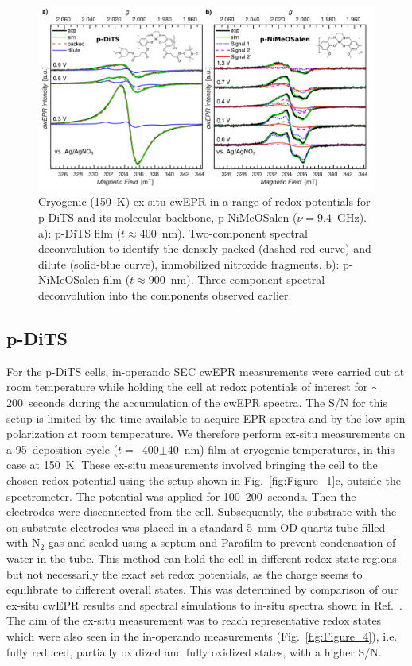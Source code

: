 \begin{figure}[ht!]
\centering
	\includegraphics[width=1\textwidth]{./operando_epr/figures/CRYO/Figure_7}
	\caption{Cryogenic (150~K) ex-situ cwEPR in a range of redox potentials for p-DiTS and its molecular backbone, p-NiMeOSalen ($\nu = 9.4$~GHz). a): p-DiTS film ($t\approx400$~nm). Two-component spectral deconvolution to identify the densely packed (dashed-red curve) and dilute (solid-blue curve), immobilized nitroxide fragments. b): p-NiMeOSalen film ($t\approx900$~nm). Three-component spectral deconvolution into the components observed earlier.\cite{Dmitrieva2018}}
	\label{fig:Figure_7}
\end{figure}


\subsection{p-DiTS} \label{Section:ex-situ_pDiTS}
%
For the p-DiTS cells, in-operando SEC cwEPR measurements were carried out at room temperature while holding the cell at redox potentials of interest for $\sim$200~seconds during the accumulation of the cwEPR spectra. The S/N for this setup is limited by the time available to acquire EPR spectra and by the low spin polarization at room temperature. We therefore perform ex-situ measurements on a 95~deposition cycle ($t =$~400$\pm$40~nm) film at cryogenic temperatures, in this case at 150~K. These ex-situ measurements involved bringing the cell to the chosen redox potential using the setup shown in Fig.~\ref{fig:Figure_1}c, outside the spectrometer. The potential was applied for 100--200~seconds. Then the electrodes were disconnected from the cell. Subsequently, the substrate with the on-substrate electrodes was placed in a standard 5~mm OD quartz tube filled with N$_2$ gas and sealed using a septum and Parafilm to prevent condensation of water in the tube. This method can hold the cell in different redox state regions but not necessarily the exact set redox potentials, as the charge seems to equilibrate to different overall states. This was determined by comparison of our ex-situ cwEPR results and spectral simulations to in-situ spectra shown in Ref.~\cite{Dmitrieva2018}. The aim of the ex-situ measurement was to reach representative redox states which were also seen in the in-operando measurements (Fig.~\ref{fig:Figure_4}), i.e. fully reduced, partially oxidized and fully oxidized states, with a higher S/N.


